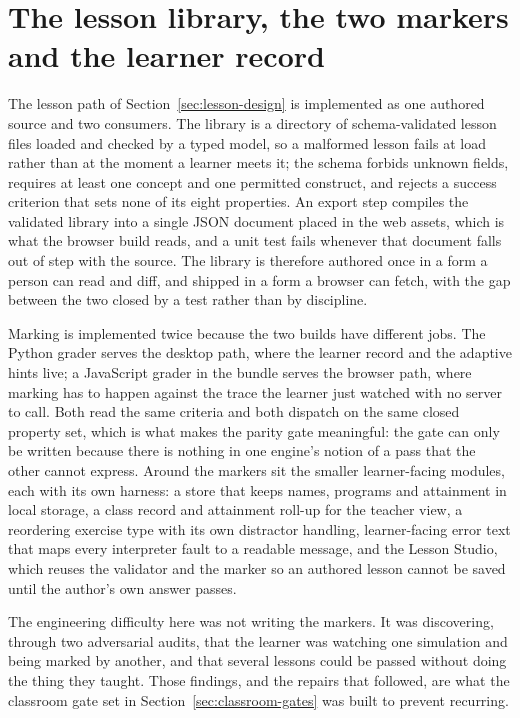\documentclass[11pt,a4paper]{report}
\begin{document}
\section{The lesson library, the two markers and the learner record}
The lesson path of Section~\ref{sec:lesson-design} is implemented as one authored source and two consumers. The library is a directory of schema-validated lesson files loaded and checked by a typed model, so a malformed lesson fails at load rather than at the moment a learner meets it; the schema forbids unknown fields, requires at least one concept and one permitted construct, and rejects a success criterion that sets none of its eight properties. An export step compiles the validated library into a single JSON document placed in the web assets, which is what the browser build reads, and a unit test fails whenever that document falls out of step with the source. The library is therefore authored once in a form a person can read and diff, and shipped in a form a browser can fetch, with the gap between the two closed by a test rather than by discipline.

Marking is implemented twice because the two builds have different jobs. The Python grader serves the desktop path, where the learner record and the adaptive hints live; a JavaScript grader in the bundle serves the browser path, where marking has to happen against the trace the learner just watched with no server to call. Both read the same criteria and both dispatch on the same closed property set, which is what makes the parity gate meaningful: the gate can only be written because there is nothing in one engine's notion of a pass that the other cannot express. Around the markers sit the smaller learner-facing modules, each with its own harness: a store that keeps names, programs and attainment in local storage, a class record and attainment roll-up for the teacher view, a reordering exercise type with its own distractor handling, learner-facing error text that maps every interpreter fault to a readable message, and the Lesson Studio, which reuses the validator and the marker so an authored lesson cannot be saved until the author's own answer passes.

The engineering difficulty here was not writing the markers. It was discovering, through two adversarial audits, that the learner was watching one simulation and being marked by another, and that several lessons could be passed without doing the thing they taught. Those findings, and the repairs that followed, are what the classroom gate set in Section~\ref{sec:classroom-gates} was built to prevent recurring.
\end{document}

